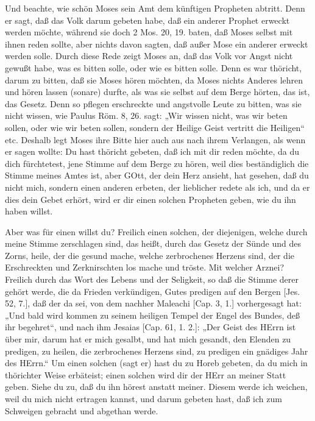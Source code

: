 Und beachte, wie schön Moses sein Amt dem künftigen Propheten abtritt. Denn er sagt, daß das Volk darum gebeten habe, daß ein anderer Prophet erweckt werden möchte, während sie doch 2 Mos. 20, 19. baten, daß Moses selbst mit ihnen reden sollte, aber nichts davon sagten, daß außer Mose ein anderer erweckt werden solle. Durch diese Rede zeigt Moses an, daß das Volk vor Angst nicht gewußt habe, was es bitten solle, oder wie es bitten solle. Denn es war thöricht, darum zu bitten, daß sie Moses hören möchten, da Moses nichts Anderes lehren und hören lassen (sonare) durfte, als was sie selbst auf dem Berge hörten, das ist, das Gesetz. Denn so pflegen erschreckte und angstvolle Leute zu bitten, was sie nicht wissen, wie Paulus Röm. 8, 26. sagt: „Wir wissen nicht, was wir beten sollen, oder wie wir beten sollen, sondern der Heilige Geist vertritt die Heiligen“ etc. Deshalb legt Moses ihre Bitte hier auch aus nach ihrem Verlangen, als wenn er sagen wollte: Du hast thöricht gebeten, daß ich mit dir reden möchte, da du dich fürchtetest, jene Stimme auf dem Berge zu hören, weil dies beständiglich die Stimme meines Amtes ist, aber GOtt, der dein Herz ansieht, hat gesehen, daß du nicht mich, sondern einen anderen erbeten, der lieblicher redete als ich, und da er dies dein Gebet erhört, wird er dir einen solchen Propheten geben, wie du ihn haben willst.

Aber was für einen willst du? Freilich einen solchen, der diejenigen, welche durch meine Stimme zerschlagen sind, das heißt, durch das Gesetz der Sünde und des Zorns, heile, der die gesund mache, welche zerbrochenes Herzens sind, der die Erschreckten und Zerknirschten los mache und tröste. Mit welcher Arznei? Freilich durch das Wort des Lebens und der Seligkeit, so daß die Stimme derer gehört werde, die da Frieden verkündigen, Gutes predigen auf den Bergen [Jes. 52, 7.], daß der da sei, von dem nachher Maleachi [Cap. 3, 1.] vorhergesagt hat: „Und bald wird kommen zu seinem heiligen Tempel der Engel des Bundes, deß ihr begehret“, und nach ihm Jesaias [Cap. 61, 1. 2.]: „Der Geist des HErrn ist über mir, darum hat er mich gesalbt, und hat mich gesandt, den Elenden zu predigen, zu heilen, die zerbrochenes Herzens sind, zu predigen ein gnädiges Jahr des HErrn.“ Um einen solchen (sagt er) hast du zu Horeb gebeten, da du mich in thörichter Weise erbäteist; einen solchen wird dir der HErr an meiner Statt geben. Siehe du zu, daß du ihn hörest anstatt meiner. Diesem werde ich weichen, weil du mich nicht ertragen kannst, und darum gebeten hast, daß ich zum Schweigen gebracht und abgethan werde.


